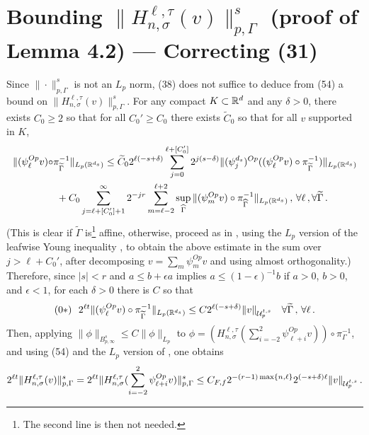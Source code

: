 \documentclass[10pt,twoside]{amsart}
\begin{document}
\section{Bounding $\|H^{\ell, \tau}_{n,\sigma}(v)\|^s_{p,\Gamma}$ (proof of Lemma 4.2) --- Correcting (31)}

Since $\|\cdot \|^s_{p,\Gamma}$ is not an $L_p$ norm, (38) does not suffice
to
deduce from (54) a bound   on $\|H^{\ell, \tau}_{n,\sigma}(v)\|^s_{p,\Gamma}$.
For any compact $K\subset \mathbb{R}^d$ and any
$\delta >0$, there exists  $C_0\ge 2$ so that for  all  $C_0'\ge C_0$ 
there exists $\widetilde C_0$ so that for all
$v$ supported in $K$, 
\begin{align*}
 \| (\psi_\ell^{Op} v) \circ& \pi_{\widetilde \Gamma}^{-1} \|_{L_p(\mathbb{R}^{d_s})} \le
\widetilde C_0 2^{\ell(-s+\delta)} \sum_{j=0}^{\ell+[C_0']} 2^{j (s-\delta)}
\| (\psi_{j}^{d_s})^{Op}((\psi_\ell^{Op} v) \circ \pi_{\widetilde \Gamma}^{-1} )\|_{L_p(\mathbb{R}^{d_s})}\\
&\,\, + C_0
\sum_{j=\ell+[C_0']+1}^{\infty} 2^{-j r} \sum_{m=\ell-2}^{\ell+2} \sup_{\widehat \Gamma}
\| (\psi_{m}^{Op} v)\circ \pi_{\widehat \Gamma}^{-1} \|_{L_p(\mathbb{R}^{d_s})}  \, ,
\, \forall \ell\, , \forall \widetilde \Gamma \, .
\end{align*}
(This  is clear if $\widetilde \Gamma$ is\footnote{The second line is then not needed.} affine, otherwise, 
proceed as in  \cite[Lemma 3.5]{Ba}, using the $L_p$ version of the leafwise Young inequality
\cite[Lemma 4.2]{BT2},
to obtain the above estimate in the sum over $j > \ell+C_0'$, 
after decomposing 
$v= \sum_m \psi_m^{Op}v$ and using almost orthogonality.)
Therefore, since $|s|< r$ and $a \le b + \epsilon a$ implies
$a \le (1-\epsilon)^{-1}b$ if $a>0$, $b>0$, and $\epsilon <1$, for each $\delta>0$ there is $C$  so that
\begin{equation*}
(0*)\, \, \, \,
2^{\ell t} \| (\psi_\ell^{Op} v) \circ \pi_{\widetilde \Gamma}^{-1} \|_{L_p(\mathbb{R}^{d_s})} 
\le C 2^{\ell(-s+\delta)} \|v\|_{\mathcal{U}_p^{t,s}} \quad
\forall \widetilde \Gamma\, , \, \forall \ell\, .
\end{equation*}
Then, applying  $\| \phi\|_{B^s_{p,\infty}} \le C \| \phi\|_{L_p}$
to $\phi= (H_{n,\sigma} ^{\ell ,\tau} (\sum_{i=-2}^2\psi_{\ell+i}^{Op} v))\circ \pi_{\Gamma}^{-1}$, 
and using (54) and the $L_p$ version of \cite[Lemma 4.2]{BT2}, one obtains
$$
2^{\ell t}\|H^{\ell, \tau}_{n,\sigma}( v)\|^s_{p,\Gamma}=2^{\ell t}\|H^{\ell, \tau}_{n,\sigma}(\sum_{i=-2}^2\psi_{\ell+i}^{Op} v)\|^s_{p,\Gamma}
\le C_{F,f} 2^{-(r-1)\max\{n ,\ell\}} 2^{(-s+\delta) \ell}  \| v\|_{\mathcal{U}_p^{t,s}}\, .
$$
\end{document}
